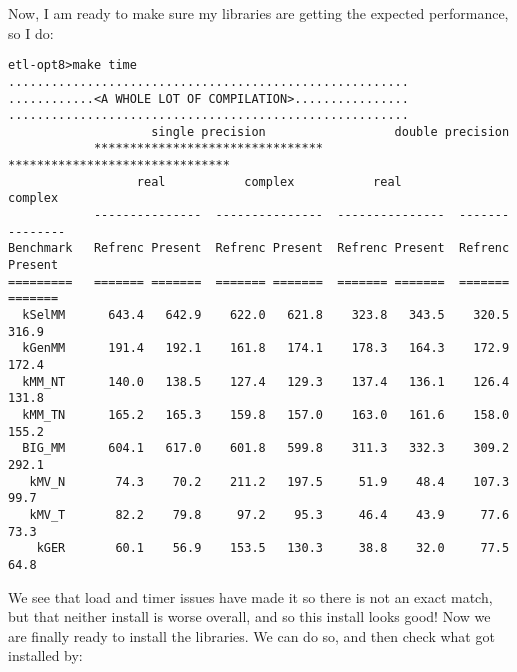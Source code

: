 \documentclass[11pt]{article}
\begin{document}
Now, I am ready to make sure my libraries are getting the expected performance,
so I do:
\vspace*{-0.1in}
\begin{footnotesize}
{\samepage
\begin{verbatim}
etl-opt8>make time
........................................................
............<A WHOLE LOT OF COMPILATION>................
........................................................
                    single precision                  double precision
            ********************************   *******************************
                  real           complex           real           complex
            ---------------  ---------------  ---------------  ---------------
Benchmark   Refrenc Present  Refrenc Present  Refrenc Present  Refrenc Present
=========   ======= =======  ======= =======  ======= =======  ======= =======
  kSelMM      643.4   642.9    622.0   621.8    323.8   343.5    320.5   316.9
  kGenMM      191.4   192.1    161.8   174.1    178.3   164.3    172.9   172.4
  kMM_NT      140.0   138.5    127.4   129.3    137.4   136.1    126.4   131.8
  kMM_TN      165.2   165.3    159.8   157.0    163.0   161.6    158.0   155.2
  BIG_MM      604.1   617.0    601.8   599.8    311.3   332.3    309.2   292.1
   kMV_N       74.3    70.2    211.2   197.5     51.9    48.4    107.3    99.7
   kMV_T       82.2    79.8     97.2    95.3     46.4    43.9     77.6    73.3
    kGER       60.1    56.9    153.5   130.3     38.8    32.0     77.5    64.8
\end{verbatim}
}
\end{footnotesize}
We see that load and timer issues have made it so there is not an exact
match, but that neither install is worse overall, and so this install
looks good!  Now we are finally ready to install the libraries.  We can
do so, and then check what got installed by:
\end{document}
